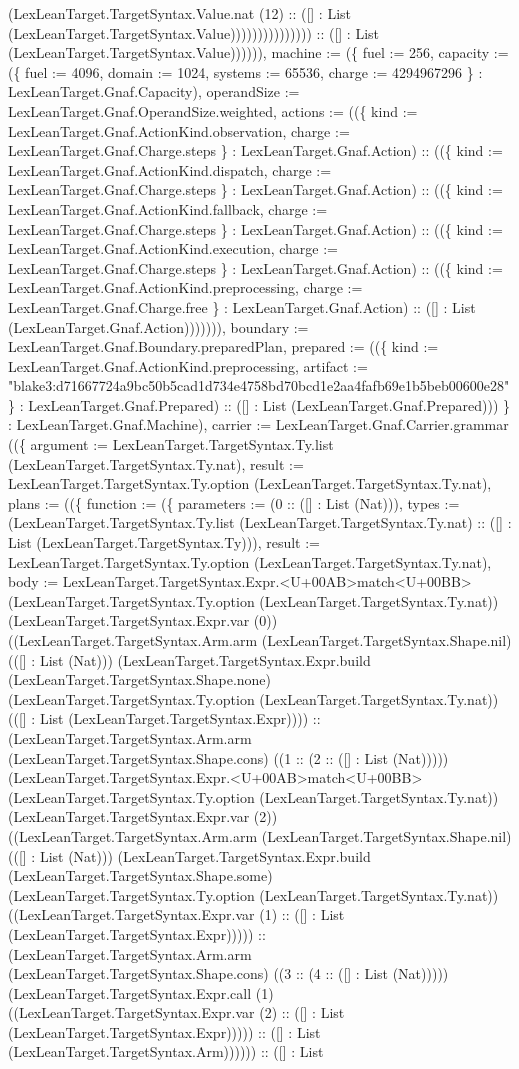 \documentclass[11pt]{article}
\begin{document}
(LexLeanTarget.TargetSyntax.Value.nat (12) :: ([] : List (LexLeanTarget.TargetSyntax.Value))))))))))))))) :: ([] : List (LexLeanTarget.TargetSyntax.Value)))))), machine := (\{ fuel := 256, capacity := (\{ fuel := 4096, domain := 1024, systems := 65536, charge := 4294967296 \} : LexLeanTarget.Gnaf.Capacity), operandSize := LexLeanTarget.Gnaf.OperandSize.weighted, actions := ((\{ kind := LexLeanTarget.Gnaf.ActionKind.observation, charge := LexLeanTarget.Gnaf.Charge.steps \} : LexLeanTarget.Gnaf.Action) :: ((\{ kind := LexLeanTarget.Gnaf.ActionKind.dispatch, charge := LexLeanTarget.Gnaf.Charge.steps \} : LexLeanTarget.Gnaf.Action) :: ((\{ kind := LexLeanTarget.Gnaf.ActionKind.fallback, charge := LexLeanTarget.Gnaf.Charge.steps \} : LexLeanTarget.Gnaf.Action) :: ((\{ kind := LexLeanTarget.Gnaf.ActionKind.execution, charge := LexLeanTarget.Gnaf.Charge.steps \} : LexLeanTarget.Gnaf.Action) :: ((\{ kind := LexLeanTarget.Gnaf.ActionKind.preprocessing, charge := LexLeanTarget.Gnaf.Charge.free \} : LexLeanTarget.Gnaf.Action) :: ([] : List (LexLeanTarget.Gnaf.Action))))))), boundary := LexLeanTarget.Gnaf.Boundary.preparedPlan, prepared := ((\{ kind := LexLeanTarget.Gnaf.ActionKind.preprocessing, artifact := "blake3:d71667724a9bc50b5cad1d734e4758bd70bcd1e2aa4fafb69e1b5beb00600e28" \} : LexLeanTarget.Gnaf.Prepared) :: ([] : List (LexLeanTarget.Gnaf.Prepared))) \} : LexLeanTarget.Gnaf.Machine), carrier := LexLeanTarget.Gnaf.Carrier.grammar ((\{ argument := LexLeanTarget.TargetSyntax.Ty.list (LexLeanTarget.TargetSyntax.Ty.nat), result := LexLeanTarget.TargetSyntax.Ty.option (LexLeanTarget.TargetSyntax.Ty.nat), plans := ((\{ function := (\{ parameters := (0 :: ([] : List (Nat))), types := (LexLeanTarget.TargetSyntax.Ty.list (LexLeanTarget.TargetSyntax.Ty.nat) :: ([] : List (LexLeanTarget.TargetSyntax.Ty))), result := LexLeanTarget.TargetSyntax.Ty.option (LexLeanTarget.TargetSyntax.Ty.nat), body := LexLeanTarget.TargetSyntax.Expr.<U+00AB>match<U+00BB> (LexLeanTarget.TargetSyntax.Ty.option (LexLeanTarget.TargetSyntax.Ty.nat)) (LexLeanTarget.TargetSyntax.Expr.var (0)) ((LexLeanTarget.TargetSyntax.Arm.arm (LexLeanTarget.TargetSyntax.Shape.nil) (([] : List (Nat))) (LexLeanTarget.TargetSyntax.Expr.build (LexLeanTarget.TargetSyntax.Shape.none) (LexLeanTarget.TargetSyntax.Ty.option (LexLeanTarget.TargetSyntax.Ty.nat)) (([] : List (LexLeanTarget.TargetSyntax.Expr)))) :: (LexLeanTarget.TargetSyntax.Arm.arm (LexLeanTarget.TargetSyntax.Shape.cons) ((1 :: (2 :: ([] : List (Nat))))) (LexLeanTarget.TargetSyntax.Expr.<U+00AB>match<U+00BB> (LexLeanTarget.TargetSyntax.Ty.option (LexLeanTarget.TargetSyntax.Ty.nat)) (LexLeanTarget.TargetSyntax.Expr.var (2)) ((LexLeanTarget.TargetSyntax.Arm.arm (LexLeanTarget.TargetSyntax.Shape.nil) (([] : List (Nat))) (LexLeanTarget.TargetSyntax.Expr.build (LexLeanTarget.TargetSyntax.Shape.some) (LexLeanTarget.TargetSyntax.Ty.option (LexLeanTarget.TargetSyntax.Ty.nat)) ((LexLeanTarget.TargetSyntax.Expr.var (1) :: ([] : List (LexLeanTarget.TargetSyntax.Expr))))) :: (LexLeanTarget.TargetSyntax.Arm.arm (LexLeanTarget.TargetSyntax.Shape.cons) ((3 :: (4 :: ([] : List (Nat))))) (LexLeanTarget.TargetSyntax.Expr.call (1) ((LexLeanTarget.TargetSyntax.Expr.var (2) :: ([] : List (LexLeanTarget.TargetSyntax.Expr))))) :: ([] : List (LexLeanTarget.TargetSyntax.Arm)))))) :: ([] : List 
\end{document}
